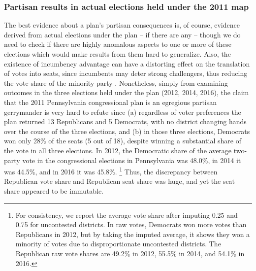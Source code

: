 \subsubsection*{Partisan results in actual elections held under the 2011 map}
%
    The best evidence about a plan’s partisan consequences is, of course, evidence derived from actual elections under the plan -- if there are any -- though we do need to check if there are highly anomalous aspects to one or more of these elections which would make results from them hard to generalize. Also, the existence of incumbency advantage can have a distorting effect on the translation of votes into seats, since incumbents may deter strong challengers, thus reducing the vote-share of the minority party \citep{Jacobson_Kernell_1981, Abramowitz1991}. Nonetheless, simply from examining outcomes in the three elections held under the plan (2012, 2014, 2016), the claim that the 2011 Pennsylvania congressional plan is an egregious partisan gerrymander is very hard to refute since (a) regardless of voter preferences the plan returned 13 Republicans and 5 Democrats, with no district changing hands over the course of the three elections, and (b) in those three elections, Democrats won only 28\% of the seats (5 out of 18), despite winning a substantial share of the vote in all three elections. In 2012, the Democratic share of the average two-party vote in the congressional elections in Pennsylvania was 48.0\%, in 2014 it was 44.5\%, and in 2016 it was 45.8\%. 
    \footnote{For consistency, we report the average vote share after imputing 0.25 and 0.75 for uncontested districts. In raw votes, Democrats won more votes than Republicans in 2012, but by taking the imputed average, it shows they won a minority of votes due to disproportionate uncontested districts. The Republican raw vote shares are 49.2\% in 2012, 55.5\% in 2014, and 54.1\% in 2016.}
    Thus, the discrepancy between Republican vote share and Republican seat share was huge, and yet the seat share appeared to be immutable.
\par
%        
